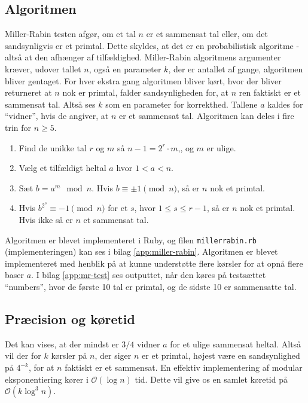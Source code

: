 \documentclass[12pt]{article}
\begin{document}
\subsection{Algoritmen}
Miller-Rabin testen afgør, om et tal $n$ er et sammensat tal eller, om det sandsynligvis er et primtal.
Dette skyldes, at det er en probabilistisk algoritme - altså at den afhænger af tilfældighed.
Miller-Rabin algoritmens argumenter kræver, udover tallet $n$, også en parameter $k$, der er antallet af gange, algoritmen bliver gentaget.
For hver ekstra gang algoritmen bliver kørt, hvor der bliver returneret at $n$ nok er primtal, falder sandsynligheden for, at $n$ ren faktiskt er et sammensat tal.
Altså ses $k$ som en parameter for korrekthed. Tallene $a$ kaldes for ``vidner'', hvis de angiver, at $n$ er et sammensat tal.
Algoritmen kan deles i fire trin for $n \geq 5$.
\begin{enumerate}
  \item Find de unikke tal $r$ og $m$ så $n-1=2^r\cdot m$,, og $m$ er ulige.
  \item Vælg et tilfældigt heltal $a$ hvor $1 < a < n$.
  \item Sæt $b = a^m \mod n$. Hvis $b \equiv \pm 1 \pmod{n}$, så er $n$ nok et primtal.
  \item Hvis $b^{2^s}\equiv -1 \pmod{n}$ for et $s$, hvor $1 \leq s \leq r-1$, så er $n$ nok et primtal. Hvis ikke så er $n$ et sammensat tal.
\end{enumerate}
Algoritmen er blevet implementeret i Ruby, og filen \texttt{millerrabin.rb} (implementeringen) kan ses i bilag \ref{app:miller-rabin}.
Algoritmen er blevet implementeret med henblik på at kunne understøtte flere kørsler for at opnå flere baser $a$. I bilag \ref{app:mr-test} 
ses outputtet, når den køres på testsættet ``numbers'', hvor de første 10 tal er primtal, og de sidste 10 er sammensatte tal.
\subsection{Præcision og køretid}
Det kan vises, at der mindst er $3/4$ vidner $a$ for et ulige sammensat heltal. Altså vil der for $k$ kørsler på $n$, der siger $n$ er et primtal,
højest være en sandsynlighed på $4^{-k}$, for at $n$ faktiskt er et sammensat. En effektiv implementering af modular eksponentiering kører
i $\mathcal{O} (\log n)$ tid. Dette vil give os en samlet køretid på $\mathcal{O} (k\log^3 n)$.
\end{document}
